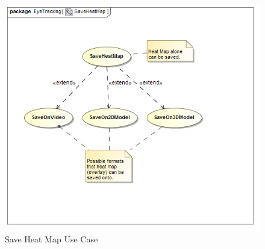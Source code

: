 	\begin{figure}[!ht]
		\centering
		\includegraphics[scale=0.5]{Diagrams/Use_Case_Diagram__SaveHeatMap.png}\newline
		\caption{Save Heat Map Use Case}
	\end{figure}		
		
	
